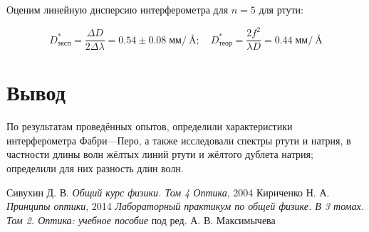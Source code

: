 \documentclass[a4paper]{article}
\begin{document}
Оценим линейную дисперсию интерферометра для $ n = 5 $ для ртути:

\[ D^*_{эксп} = \frac{\Delta D}{2 \Delta \lambda} = 0.54\pm 0.08 \; мм/\SI{}{\angstrom}; \quad  D^*_{теор} = \frac{2f^2}{\lambda D} = 0.44 \; мм/\SI{}{\angstrom} \]


\section{Вывод}

По результатам проведённых опытов, определили характеристики интерферометра Фабри---Перо, а также исследовали спектры ртути и натрия, в частности длины волн жёлтых линий ртути и жёлтого дублета натрия; определили для них разность длин волн.

\newpage
\begin{thebibliography}{9}
	 Сивухин Д. В. \emph{Общий курс физики. Том 4 Оптика}, 2004
	 Кириченко Н. А. \emph{Принципы оптики}, 2014
	 \emph{Лабораторный практикум по общей физике. В 3 томах. Том 2. Оптика: учебное пособие} под ред. А. В. Максимычева
\end{thebibliography}
\end{document}
